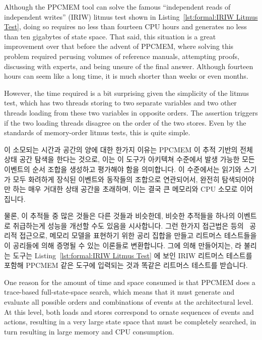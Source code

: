 Although the PPCMEM tool can solve the famous ``independent reads of
independent writes'' (IRIW) litmus test shown in
Listing~\ref{lst:formal:IRIW Litmus Test}, doing so requires no less than
fourteen CPU hours and generates no less than ten gigabytes of state space.
That said, this situation is a great improvement over that before the advent
of PPCMEM, where solving this problem required perusing volumes of
reference manuals, attempting proofs, discussing with experts, and
being unsure of the final answer.
Although fourteen hours can seem like a long time, it is much shorter
than weeks or even months.

However, the time required is a bit surprising given the simplicity
of the litmus test, which has two threads storing to two separate variables
and two other threads loading from these two variables in opposite
orders.
The assertion triggers if the two loading threads disagree on the order
of the two stores.
Even by the standards of memory-order litmus tests, this is quite simple.

\fi

이 소모되는 시간과 공간의 양에 대한 한가지 이유는 PPCMEM 이 추적 기반의 전체
상태 공간 탐색을 한다는 것으로, 이는 이 도구가 아키텍쳐 수준에서 발생 가능한
모든 이벤트의 순서 조합을 생성하고 평가해야 함을 의미합니다.
이 수준에서는 읽기와 스기가 모두 화려하게 장식된 이벤트와 동작들의 조합으로
연관되어서, 완전히 탐색되어야만 하는 매우 거대한 상태 공간을 초래하며, 이는
결국 큰 메모리와 CPU 소모로 이어집니다.

물론, 이 추적들 중 많은 것들은 다른 것들과 비슷한데, 비슷한 추적들을 하나의
이벤트로 취급하는게 성능을 개선할 수도 있음을 시사합니다.
그런 한가지 접근법은 
 등의~\cite{Alglave:2014:HCM:2594291.2594347} 공리적
접근으로, 메모리 모델을 표현하기 위한 공리 집합을 만들고 리트머스 테스트들을 이
공리들에 의해 증명될 수 있는 이론들로 변환합니다.
그에 의해 만들어지는,  라 불리는 도구는
Listing~\ref{lst:formal:IRIW Litmus Test} 에 보인 IRIW 리트머스 테스트를 포함해
PPCMEM 같은 도구에 입력되는 것과 똑같은 리트머스 테스트를 받습니다.

\iffalse

One reason for the amount of time and space consumed is that PPCMEM does
a trace-based full-state-space search, which means that it must generate
and evaluate all possible orders and combinations of events at the
architectural level.
At this level, both loads and stores correspond to ornate sequences
of events and actions, resulting in a very large state space that must
be completely searched, in turn resulting in large memory and CPU
consumption.

